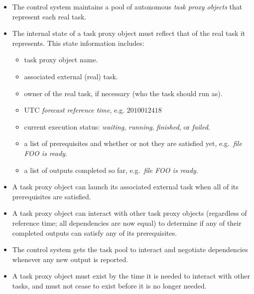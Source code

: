 \documentclass[11pt,a4paper]{article}
\begin{document}
\begin{itemize}
    \item The control system maintains a pool of autonomous {\em task
        proxy objects} that represent each real task. 
       
    \item The internal state of a task proxy object must reflect that
        of the real task it represents. This state information includes:

        \begin{itemize}

            \item task proxy object name.

            \item associated external (real) task.  

            \item owner of the real task, if necessary (who the task
                should run as).

            \item UTC {\em forecast reference time}, e.g. $2010012418$
        
            \item current execution status: {\em waiting}, {\em running}, 
                {\em finished}, or {\em failed}. 

            \item a list of prerequisites and whether or not they are
                satisfied yet, e.g.\ {\em file FOO is ready}. 

            \item a list of outputs completed so far, e.g.\ {\em file
                FOO is ready}.

        \end{itemize}
       
    \item A task proxy object can launch its associated external task
        when all of its prerequisites are satisfied.

    \item A task proxy object can interact with other task proxy
        objects (regardless of reference time; all dependencies are now
        equal) to determine if any of their completed outputs can
        satisfy any of its prerequisites.

    \item The control system gets the task pool to interact and
        negotiate dependencies whenever any new output is reported.
 
    \item A task proxy object must exist by the time it is needed to
        interact with other tasks, and must not cease to exist before
        it is no longer needed.

\end{itemize}
\end{document}

